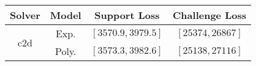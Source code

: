 \begin{tabular}{cc|c|c} 
\hline 
 Solver & Model & Support Loss  & Challenge Loss \tabularnewline\hline 
\hline 
\multirow{2}{*}{c2d} & Exp. & $\left[3570.9,3979.5\right]$ & $\left[25374,26867\right]$ \tabularnewline 
 & Poly. & $\left[3573.3,3982.6\right]$ & $\left[25138,27116\right]$ \tabularnewline 
\hline 
\end{tabular} 


